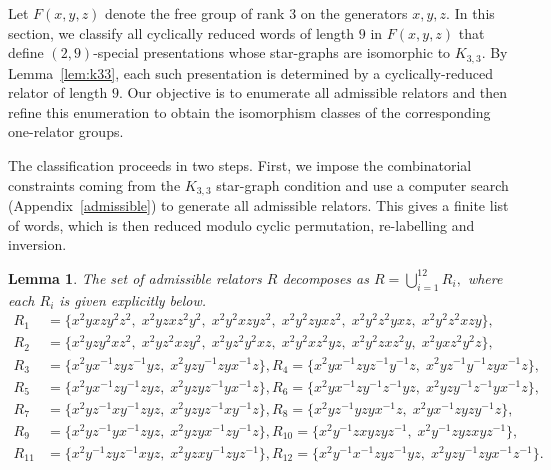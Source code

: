 \documentclass[a4paper,12pt,oneside]{article}
\newtheorem{lem}[theorem]{Lemma}
\begin{document}
Let $F(x,y,z)$ denote the free group of rank $3$ on the generators $x,y,z$. In this section, we classify all cyclically reduced words of length $9$ in $F(x,y,z)$ that define $(2,9)$-special presentations whose star-graphs are isomorphic to $K_{3,3}$. By Lemma~\ref{lem:k33}, each such presentation is determined by a cyclically-reduced relator of length $9$. Our objective is to enumerate all admissible relators and then refine this enumeration to obtain the isomorphism classes of the corresponding one-relator groups.

\medskip
The classification proceeds in two steps. First, we impose the combinatorial constraints coming from the $K_{3,3}$ star-graph condition and use a computer search (Appendix~\ref{admissible}) to generate all admissible relators. This gives a finite list of words, which is then reduced modulo cyclic permutation, re-labelling and inversion.

\begin{lem}\label{lem:enumeration}
The set of admissible relators $R$ decomposes as
\(
R = \bigcup_{i=1}^{12} R_i,
\)
where each $R_i$ is given explicitly below.
\begin{align*}
R_1 &= \{x^2 y x z y^2 z^2, \; x^2 y z x z^2 y^2, \; x^2 y^2 x z y z^2, \; x^2 y^2 z y x z^2, \; x^2 y^2 z^2 y x z, \; x^2 y^2 z^2 x z y\}, \\
R_2 &= \{x^2 y z y^2 x z^2, \; x^2 y z^2 x z y^2, \; x^2 y z^2 y^2 x z, \; x^2 y^2 x z^2 y z, \; x^2 y^2 z x z^2 y, \; x^2 y x z^2 y^2 z\}, \\
R_3 &= \{x^2 y x^{-1} z y z^{-1} y z, \; x^2 y z y^{-1} z y x^{-1} z\}, 
R_4 = \{x^2 y x^{-1} z y z^{-1} y^{-1} z, \; x^2 y z^{-1} y^{-1} z y x^{-1} z\}, \\
R_5 &= \{x^2 y x^{-1} z y^{-1} z y z, \; x^2 y z y z^{-1} y x^{-1} z\}, 
R_6 = \{x^2 y x^{-1} z y^{-1} z^{-1} y z, \; x^2 y z y^{-1} z^{-1} y x^{-1} z\}, \\
R_7 &= \{x^2 y z^{-1} x y^{-1} z y z, \; x^2 y z y z^{-1} x y^{-1} z\}, 
R_8 = \{x^2 y z^{-1} y z y x^{-1} z, \; x^2 y x^{-1} z y z y^{-1} z\}, \\
R_9 &= \{x^2 y z^{-1} y x^{-1} z y z, \; x^2 y z y x^{-1} z y^{-1} z\}, 
R_{10} = \{x^2 y^{-1} z x y z y z^{-1}, \; x^2 y^{-1} z y z x y z^{-1}\}, \\
R_{11} &= \{x^2 y^{-1} z y z^{-1} x y z, \; x^2 y z x y^{-1} z y z^{-1}\}, 
R_{12} = \{x^2 y^{-1} x^{-1} z y z^{-1} y z, \; x^2 y z y^{-1} z y x^{-1} z^{-1}\}.
\end{align*}
\end{lem}
\end{document}

